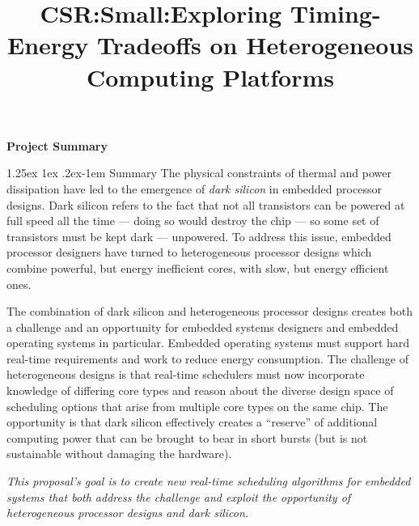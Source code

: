 \documentclass[10pt,letterpaper]{article}
\title{\textbf{CSR:Small:Exploring Timing-Energy Tradeoffs on Heterogeneous Computing Platforms}}
\date{\vspace{4mm}}
\makeatletter
\renewcommand{\paragraph}{%
  \@startsection{paragraph}{4}%
  {\z@}{1.25ex \@plus 1ex \@minus .2ex}{-1em}%
  {\normalfont\normalsize\bfseries}%
}
\makeatother
\begin{document}




\thispagestyle{empty}


\begin{center}
\Large{\textbf{Project Summary}}
\end{center}

\paragraph{Summary}
The physical constraints of thermal and power dissipation have led to
the emergence of \emph{dark silicon} in embedded processor designs.
Dark silicon refers to the fact that not all transistors can be
powered at full speed all the time --- doing so would destroy the chip
--- so some set of transistors must be kept dark --- unpowered.  To
address this issue, embedded processor designers have turned to
heterogeneous processor designs which combine powerful, but energy
inefficient cores, with slow, but energy efficient ones.

The combination of dark silicon and heterogeneous processor designs
creates both a challenge and an opportunity for embedded systems
designers and embedded operating systems in particular.  Embedded
operating systems must support hard real-time requirements and work to
reduce energy consumption.  The challenge of heterogeneous designs is
that real-time schedulers must now incorporate knowledge of differing
core types and reason about the diverse design space of scheduling
options that arise from multiple core types on the same chip.  The
opportunity is that dark silicon effectively creates a ``reserve'' of
additional computing power that can be brought to bear in short bursts
(but is not sustainable without damaging the hardware).  

\emph{This proposal's goal is to create new real-time scheduling
  algorithms for embedded systems that both address the challenge and
  exploit the opportunity of heterogeneous processor designs and dark
  silicon.}
\end{document}
